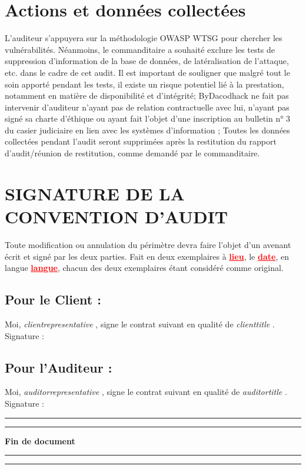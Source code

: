 \documentclass[12pt]{extarticle}
\begin{document}
\section{Actions et données collectées}
    L’auditeur s’appuyera sur la méthodologie OWASP WTSG pour chercher les vulnérabilités. Néanmoins, le commanditaire a souhaité exclure les tests de suppression d’information de la base de données, de latéralisation de l’attaque, etc. dans le cadre de cet audit. Il est important de souligner que malgré tout le soin apporté pendant les tests, il existe un risque potentiel lié à la prestation, notamment en matière de disponibilité et d’intégrité;
    ByDacodhack ne fait pas intervenir d’auditeur n’ayant pas de relation contractuelle avec lui, n'ayant pas signé sa charte d’éthique ou ayant fait l’objet d’une inscription au bulletin n° 3 du casier judiciaire en lien avec les systèmes d’information ;
    Toutes les données collectées pendant l’audit seront supprimées après la restitution du rapport d’audit/réunion de restitution, comme demandé par le commanditaire.
\newpage
\section{SIGNATURE DE LA CONVENTION D'AUDIT}
    Toute modification ou annulation du périmètre devra faire l'objet d'un avenant écrit et signé par les deux parties.
    Fait en deux exemplaires à \textcolor{red}{\textbf{\underline{lieu}}}, le \textcolor{red}{\textbf{\underline{date}}}, en langue \textcolor{red}{\textbf{\underline{langue}}}, chacun des deux exemplaires étant considéré comme original.
    \subsection{Pour le Client :}
    Moi, \textit{ {{clientrepresentative}} }, signe le contrat suivant en qualité de \textit{ {{clienttitle}} }.
    \vspace{3cm}
    Signature :
    \subsection{Pour l'Auditeur :}
    Moi, \textit{ {{auditorrepresentative}} }, signe le contrat suivant en qualité de \textit{ {{auditortitle}} }.
    \vspace{3cm}
    Signature :
    \noindent\rule{\textwidth}{0.4pt}
    \vspace{1cm}
    \noindent\rule{\textwidth}{0.4pt}
    \begin{center}
        \Huge\textbf{Fin de document}
    \end{center}
    \vspace{1cm}
    \noindent\rule{\textwidth}{0.4pt}
    \vspace{1cm}
    \noindent\rule{\textwidth}{0.4pt}
\end{document}
